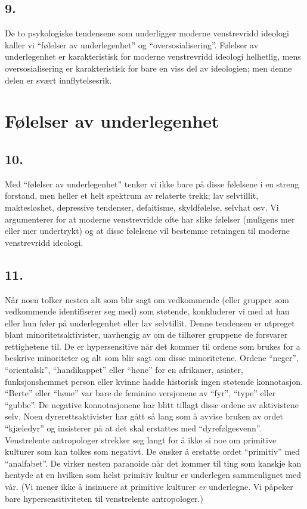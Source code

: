 \documentclass[oneside]{book}
\begin{document}
\section*{9.}
De to psykologiske tendensene som underligger moderne venstrevridd ideologi
kaller vi ``følelser av underlegenhet'' og ``oversosialisering''. Følelser av
underlegenhet er karakteristisk for moderne venstrevridd ideologi helhetlig,
mens oversosialisering er karakteristisk for bare en viss del av ideologien;
men denne delen er svært innflytelsesrik.

\chapter{Følelser av underlegenhet}

\section*{10.}
Med ``følelser av underlegenhet'' tenker vi ikke bare på disse følelsene i en
streng forstand, men heller et helt spektrum av relaterte trekk; lav
selvtillit, maktesløshet, depressive tendenser, defaitisme, skyldfølelse,
selvhat osv. Vi argumenterer for at moderne venstrevridde ofte har slike
følelser (muligens mer eller mer undertrykt) og at disse følelsene vil bestemme
retningen til moderne venstrevridd ideologi.

\section*{11.}
Når noen tolker nesten alt som blir sagt om vedkommende (eller grupper som
vedkommende identifiserer seg med) som støtende, konkluderer vi med at han
eller hun føler på underlegenhet eller lav selvtillit. Denne tendensen er
utpreget blant minoritetsaktivister, uavhengig av om de tilhører gruppene de
forsvarer rettighetene til. De er hypersensitive når det kommer til ordene som
brukes for a beskrive minoriteter og alt som blir sagt om disse minoritetene.
Ordene ``neger'', ``orientalsk'', ``handikappet'' eller ``høne'' for en
afrikaner, asiater, funksjonshemmet person eller kvinne hadde historisk ingen
støtende konnotasjon. ``Berte'' eller ``høne'' var bare de feminine versjonene
av ``fyr'', ``type'' eller ``gubbe''. De negative konnotasjonene har blitt
tillagt disse ordene av aktivistene selv. Noen dyrerettsaktivister har gått så
lang som å avvise bruken av ordet ``kjæledyr'' og insisterer på at det skal
erstattes med ``dyrefølgesvenn''. Venstrelente antropologer strekker seg langt
for å ikke si noe om primitive kulturer som kan tolkes som negativt. De ønsker
å erstatte ordet ``primitiv'' med ``analfabet''. De virker nesten paranoide når
det kommer til ting som kanskje kan hentyde at en hvilken som helst primitiv
kultur er underlegen sammenlignet med vår. (Vi mener ikke å insinuere at
primitive kulturer \emph{er} underlegne. Vi påpeker bare hypersensitiviteten til
venstrelente antropologer.)
\end{document}
